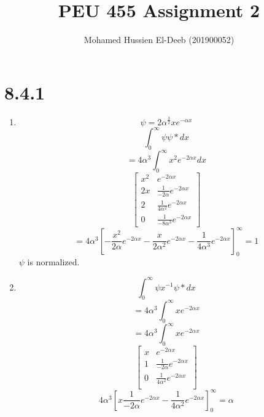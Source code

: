 \documentclass[12pt]{article}
\title{PEU 455 Assignment 2}
\author{Mohamed Hussien El-Deeb (201900052)}
\date{}
\begin{document}
\maketitle
\tableofcontents

\newcommand{\Lagr}{\mathcal{L}}
\renewcommand{\labelenumi}{\textbf{(\alph{enumi})}}

\section{8.4.1}

\begin{enumerate}
    \item
          \[
              \psi = 2\alpha^{\frac{3}{2}} x e^{-\alpha x}
          \]
          \[
              \int_0^\infty \psi \psi* dx
          \]
          \[
              = 4 \alpha^3 \int_0^\infty  x^2 e^{-2 \alpha x} dx
          \]
          \[
              \begin{bmatrix}
                  x^2 & e^{-2\alpha x}                      \\
                  2x  & \frac{1}{-2\alpha} e^{-2\alpha x}   \\
                  2   & \frac{1}{4\alpha^2} e^{-2\alpha x}  \\
                  0   & \frac{1}{-8\alpha^3} e^{-2\alpha x}
              \end{bmatrix}
          \]
          \[
              = 4 \alpha^3 \left[ - \frac{x^2}{2\alpha} e^{-2\alpha x} - \frac{x}{2\alpha^2} e^{-2\alpha x} - \frac{1}{4\alpha^3} e^{-2\alpha x} \right]^\infty_0 = 1
          \]
          $\psi$ is normalized.
    \item \[
              \int_0^\infty \psi x^{-1} \psi* dx
          \]
          \[
              = 4 \alpha^3 \int_0^\infty  x e^{-2 \alpha x}
          \]
          \[
              = 4 \alpha^3 \int_0^\infty  x e^{-2 \alpha x}
          \]
          \[
              \begin{bmatrix}
                  x & e^{-2\alpha x}                     \\
                  1 & \frac{1}{-2\alpha} e^{-2\alpha x}  \\
                  0 & \frac{1}{4\alpha^2} e^{-2\alpha x} \\
              \end{bmatrix}
          \]
          \[
              4 \alpha^3 \left[x\frac{1}{-2\alpha} e^{-2\alpha x} - \frac{1}{4\alpha^2} e^{-2\alpha x} \right]_0^\infty
              = \alpha
          \]

\end{enumerate}
\end{document}

